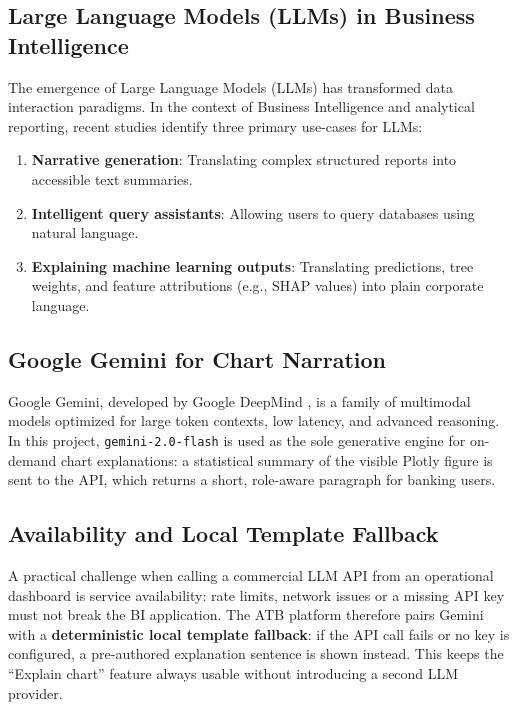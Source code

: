 \subsection{Large Language Models (LLMs) in Business Intelligence}

The emergence of Large Language Models (LLMs) has transformed data interaction paradigms.
In the context of Business Intelligence and analytical reporting, recent studies \cite{baidoo2023}
identify three primary use-cases for LLMs:
\begin{enumerate}
    \item \textbf{Narrative generation}: Translating complex structured reports into accessible text summaries.
    \item \textbf{Intelligent query assistants}: Allowing users to query databases using natural language.
    \item \textbf{Explaining machine learning outputs}: Translating predictions, tree weights, and feature attributions (e.g., SHAP values) into plain corporate language.
\end{enumerate}

\subsection{Google Gemini for Chart Narration}

Google Gemini, developed by Google DeepMind \cite{gemini2024}, is a family of multimodal
models optimized for large token contexts, low latency, and advanced reasoning. In this
project, \texttt{gemini-2.0-flash} is used as the sole generative engine for on-demand
chart explanations: a statistical summary of the visible Plotly figure is sent to the
API, which returns a short, role-aware paragraph for banking users.

\subsection{Availability and Local Template Fallback}

A practical challenge when calling a commercial LLM API from an operational dashboard is
service availability: rate limits, network issues or a missing API key must not break the
BI application. The ATB platform therefore pairs Gemini with a \textbf{deterministic local
template fallback}: if the API call fails or no key is configured, a pre-authored
explanation sentence is shown instead. This keeps the ``Explain chart'' feature always
usable without introducing a second LLM provider.



